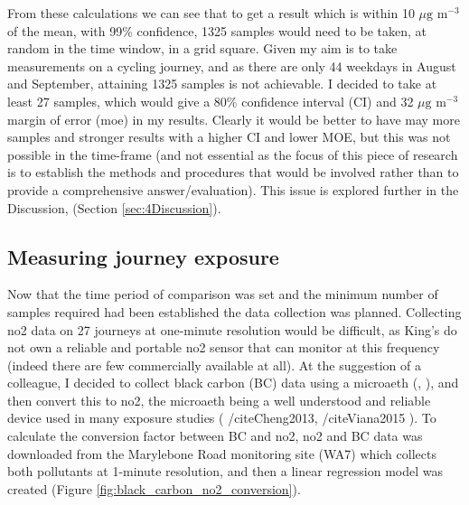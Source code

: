 From these calculations we can see that to get a result which is within 10 $\mu \text{g m}^{-3}$ of the mean, with 99\% confidence, 1325 samples would need to be taken, at random in the time window, in a grid square. Given my aim is to take measurements on a cycling journey, and as there are only 44 weekdays in August and September, attaining 1325 samples is not achievable. I decided to take at least 27 samples, which would give a 80\% confidence interval (CI) and 32 $\mu \text{g m}^{-3}$ margin of error (\gls{moe}) in my results. Clearly it would be better to have may more samples and stronger results with a higher CI and lower MOE, but this was not possible in the time-frame (and not essential as the focus of this piece of research is to establish the methods and procedures that would be involved rather than to provide a comprehensive answer/evaluation). This issue is explored further in the Discussion, (Section \ref{sec:4Discussion}).

\subsection{Measuring journey exposure}
\label{subsec:measuringjourneyexposure}

Now that the time period of comparison was set and the minimum number of samples required had been established  the data collection was planned. Collecting \gls{no2} data on 27 journeys at one-minute resolution would be difficult, as King’s do not own a reliable and portable \gls{no2} sensor that can monitor at this frequency (indeed there are few commercially available at all). At the suggestion of a colleague, I decided to collect black carbon (BC) data using a microaeth (\cite{Hansen1984}, \cite{Aethlabs2016}), and then convert this to \gls{no2}, the microaeth being a well understood and reliable device used in many exposure studies ( /cite{Cheng2013}, /cite{Viana2015} ). To calculate the conversion factor between BC and \gls{no2}, \gls{no2} and BC data was downloaded from the Marylebone Road monitoring site (WA7) which collects both pollutants at 1-minute resolution, and then a linear regression model was created (Figure \ref{fig:black_carbon_no2_conversion}). 

